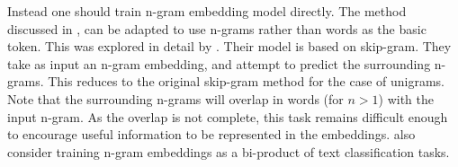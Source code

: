 \documentclass[12pt,parskip]{komatufte}
\begin{document}


Instead one should train n-gram embedding model directly.
The method discussed in , can be adapted to use n-grams rather than words as the basic token.
This was explored in detail by .
Their model is based on skip-gram.
They take as input an n-gram embedding, and attempt to predict the surrounding n-grams.
This reduces to the original skip-gram method for the case of unigrams.
Note that the surrounding n-grams will overlap in words (for $n>1$)  with the input n-gram.
As the overlap is not complete, this task remains difficult enough to encourage useful information to be represented in the embeddings.
\textcite{li2017neural} also consider training n-gram embeddings as a bi-product of text classification tasks.
\end{document}
